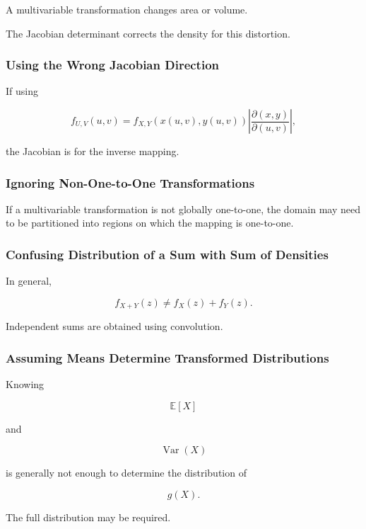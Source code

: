 A multivariable transformation changes area or volume.

The Jacobian determinant corrects the density for this distortion.

\subsubsection{Using the Wrong Jacobian Direction}

If using

\[
f_{U,V}(u,v)
=
f_{X,Y}(x(u,v),y(u,v))
\left|
\frac{\partial(x,y)}{\partial(u,v)}
\right|,
\]

the Jacobian is for the inverse mapping.

\subsubsection{Ignoring Non-One-to-One Transformations}

If a multivariable transformation is not globally one-to-one, the
domain may need to be partitioned into regions on which the mapping is
one-to-one.

\subsubsection{Confusing Distribution of a Sum with Sum of Densities}

In general,

\[
f_{X+Y}(z)
\neq
f_X(z)+f_Y(z).
\]

Independent sums are obtained using convolution.

\subsubsection{Assuming Means Determine Transformed Distributions}

Knowing

\[
\mathbb{E}[X]
\]

and

\[
\operatorname{Var}(X)
\]

is generally not enough to determine the distribution of

\[
g(X).
\]

The full distribution may be required.

